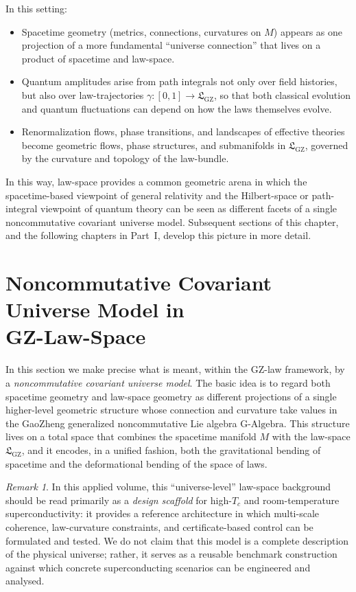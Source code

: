 \documentclass[11pt]{book}
\newcommand{\GAlgebra}{\text{G-Algebra}}
\newcommand{\GZLS}{\ensuremath{\mathfrak{L}_{\mathrm{GZ}}}}
\newcommand{\Base}{\ensuremath{M}}
\theoremstyle{plain}
\theoremstyle{definition}
\theoremstyle{remark}
\newtheorem{remark}[theorem]{Remark}
\begin{document}
In this setting:

\begin{itemize}
  \item Spacetime geometry (metrics, connections, curvatures on
        $\Base$) appears as one projection of a more fundamental
        ``universe connection'' that lives on a product of spacetime
        and law-space.
  \item Quantum amplitudes arise from path integrals not only over
        field histories, but also over law-trajectories
        $\gamma \colon [0,1] \to \GZLS$, so that both classical
        evolution and quantum fluctuations can depend on how the
        laws themselves evolve.
  \item Renormalization flows, phase transitions, and landscapes of
        effective theories become geometric flows, phase structures,
        and submanifolds in $\GZLS$, governed by the curvature and
        topology of the law-bundle.
\end{itemize}

In this way, law-space provides a common geometric arena in which
the spacetime-based viewpoint of general relativity and the
Hilbert-space or path-integral viewpoint of quantum theory can be
seen as different facets of a single noncommutative covariant
universe model. Subsequent sections of this chapter, and the
following chapters in Part~I, develop this picture in more detail.

\section[Noncommutative Covariant Universe Model GZ-Law-Space]{Noncommutative Covariant Universe Model in \\ GZ-Law-Space}
\label{sec:nc-covariant-universe}


In this section we make precise what is meant, within the GZ-law
framework, by a \emph{noncommutative covariant universe model}.
The basic idea is to regard both spacetime geometry and law-space
geometry as different projections of a single higher-level geometric
structure whose connection and curvature take values in the GaoZheng
generalized noncommutative Lie algebra $\GAlgebra$. This structure
lives on a total space that combines the spacetime manifold $\Base$
with the law-space $\GZLS$, and it encodes, in a unified fashion,
both the gravitational bending of spacetime and the deformational
bending of the space of laws.

\begin{remark}
In this applied volume, this ``universe-level'' law-space background
should be read primarily as a \emph{design scaffold} for high-$T_c$
and room-temperature superconductivity: it provides a reference
architecture in which multi-scale coherence, law-curvature constraints,
and certificate-based control can be formulated and tested. We do not
claim that this model is a complete description of the physical
universe; rather, it serves as a reusable benchmark construction
against which concrete superconducting scenarios can be engineered
and analysed.
\end{remark}
\end{document}
